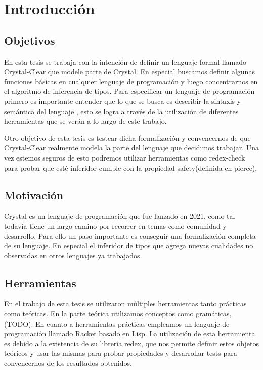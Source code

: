 \setchapterpreamble[u]{\margintoc}
\chapter{Introducción}

\section{Objetivos}

En esta tesis se trabaja con la intención de definir un lenguaje formal llamado Crystal-Clear
 que modele parte de Crystal. En especial buscamos definir algunas funciones
 básicas en cualquier lenguaje de programación y luego concentrarnos en el algoritmo de inferencia
 de tipos. Para especificar un lenguaje de programación primero es
 importante entender que lo que se busca es describir la sintaxis y semántica del lenguaje
, esto se logra a través de la utilización de diferentes herramientas que se verán a lo largo
 de este trabajo.
 
Otro objetivo de esta tesis es testear dicha formalización y convencernos de que
 Crystal-Clear realmente modela la parte del lenguaje que decidimos trabajar.
 Una vez estemos seguros de esto podremos utilizar herramientas como redex-check
 para probar que esté inferidor cumple con la propiedad safety(definida en pierce).

 \section{Motivación}
 
 Crystal es un lenguaje de programación que fue lanzado en 2021, como tal todavía
 tiene un largo camino por recorrer en temas como comunidad y desarrollo. Para ello
 un paso importante es conseguir una formalización completa de su lenguaje.
 En especial el inferidor de tipos que agrega nuevas cualidades no observadas en otros
 lenguajes ya trabajados.

\section{Herramientas}

En el trabajo de esta tesis se utilizaron múltiples herramientas tanto prácticas
 como teóricas. En la parte teórica utilizamos conceptos como gramáticas, (TODO).
 En cuanto a herramientas prácticas empleamos un lenguaje de programación
 llamado Racket basado en Lisp. La utilización de esta herramienta es debido a
 la existencia  de su librería redex, que nos permite definir estos objetos teóricos
 y usar las mismas para probar propiedades y desarrollar tests para convencernos de
 los resultados obtenidos.


